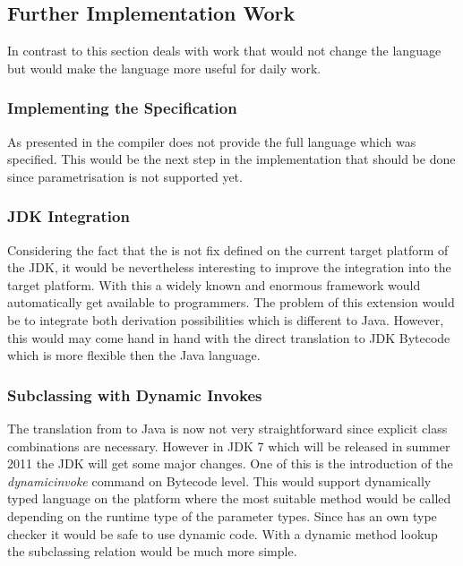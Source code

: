 
\subsection{Further Implementation Work}
In contrast to  this section deals with work that
would not change the language but would make the language more useful
for daily work.

\subsubsection{Implementing the Specification}
As presented in  the compiler does not provide the
full language which was specified. This would be the next step in the 
implementation that should be done since parametrisation is not supported
yet.

\subsubsection{JDK Integration}
Considering the fact that the \ooplss is not fix defined on the current
target platform of the JDK, it would be nevertheless interesting to
improve the integration into the target platform. With this a widely
known and enormous framework would automatically get available to
\ooplss programmers. The problem of this extension would be to integrate
both derivation possibilities which is different to Java. However,
this would may come hand in hand with the direct translation to JDK
Bytecode which is more flexible then the Java language. 

\subsubsection{Subclassing with Dynamic Invokes}
The translation from \ooplss to Java is now not very straightforward since
explicit class combinations are necessary. However in JDK 7 which will
be released in summer 2011 the JDK will get some major changes. One 
of this is the introduction of the \emph{dynamicinvoke} command on 
Bytecode level. This would support dynamically typed language on the
platform where the most suitable method would be called depending on the
runtime type of the parameter types. Since \ooplss has an own type
checker it would be safe to use dynamic code. With a dynamic method 
lookup the subclassing relation would be much more simple.

